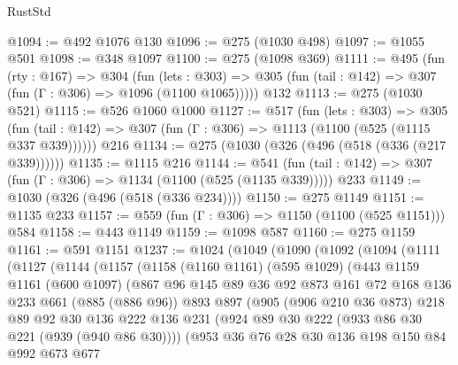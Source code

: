 \begin{lexlean}{RustStd}
\begin{coremodule}
@1094 := @492 @1076 @130
@1096 := @275 (@1030 @498)
@1097 := @1055 @501
@1098 := @348 @1097
@1100 := @275 (@1098 @369)
@1111 := @495
    (fun (rty : @167) =>
    @304
      (fun (lets : @303) =>
      @305 (fun (tail : @142) => @307 (fun (Γ : @306) => @1096 (@1100 @1065)))))
    @132
@1113 := @275 (@1030 @521)
@1115 := @526 @1060 @1000
@1127 := @517
    (fun (lets : @303) =>
    @305 (fun (tail : @142) => @307 (fun (Γ : @306) => @1113 (@1100 (@525 (@1115 @337 @339))))))
    @216
@1134 := @275 (@1030 (@326 (@496 (@518 (@336 (@217 @339))))))
@1135 := @1115 @216
@1144 := @541 (fun (tail : @142) => @307 (fun (Γ : @306) => @1134 (@1100 (@525 (@1135 @339))))) @233
@1149 := @1030 (@326 (@496 (@518 (@336 @234))))
@1150 := @275 @1149
@1151 := @1135 @233
@1157 := @559 (fun (Γ : @306) => @1150 (@1100 (@525 @1151))) @584
@1158 := @443 @1149
@1159 := @1098 @587
@1160 := @275 @1159
@1161 := @591 @1151
@1237 := @1024
    (@1049
      (@1090
        (@1092
          (@1094
            (@1111
              (@1127
                (@1144
                  (@1157
                    (@1158
                      (@1160 @1161)
                      (@595 @1029)
                      (@443
                        @1159
                        @1161
                        (@600 @1097)
                        (@867
                          @96
                          @145
                          @89
                          @36
                          @92
                          @873
                          @161
                          @72
                          @168
                          @136
                          @233
                          @661
                          (@885 (@886 @96))
                          @893
                          @897
                          (@905
                            (@906 @210 @36 @873)
                            @218
                            @89
                            @92
                            @30
                            @136
                            @222
                            @136
                            @231
                            (@924 @89 @30 @222 (@933 @86 @30 @221 (@939 (@940 @86 @30))))
                            (@953
                              @36
                              @76
                              @28
                              @30
                              @136
                              @198
                              @150
                              @84
                              @992
                              @673
                              @677

\end{coremodule}
\end{lexlean}

